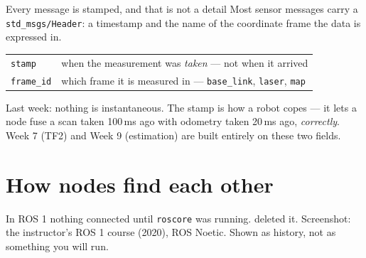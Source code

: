 \documentclass[aspectratio=169]{beamer}
\begin{document}
\begin{frame}{Every message is stamped, and that is not a detail}
  \small
  Most sensor messages carry a \texttt{std\_msgs/Header}: a timestamp and the name of the
  coordinate frame the data is expressed in.

  \vspace{0.6em}
  \begin{center}
  \begin{tabular}{@{}ll@{}}
    \toprule
    \texttt{stamp} & when the measurement was \emph{taken} --- not when it arrived \\
    \texttt{frame\_id} & which frame it is measured in --- \texttt{base\_link}, \texttt{laser}, \texttt{map} \\
    \bottomrule
  \end{tabular}
  \end{center}

  \vspace{0.8em}
  \begin{underhood}
    \footnotesize
    Last week: nothing is instantaneous. The stamp is how a robot copes --- it lets a node
    fuse a scan taken 100\,ms ago with odometry taken 20\,ms ago, \emph{correctly}. Week 7
    (TF2) and Week 9 (estimation) are built entirely on these two fields.
  \end{underhood}
\end{frame}

\section{How nodes find each other}

  {In ROS 1 nothing connected until \texttt{roscore} was running. \rosver{} deleted it.}
  {Screenshot: the instructor's ROS 1 course (2020), ROS Noetic. Shown as history, not as something you will run.}
\end{document}
